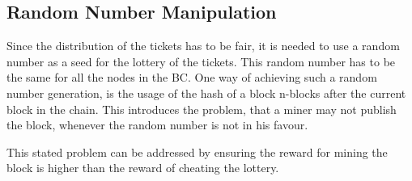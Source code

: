 \subsection{Random Number Manipulation}\label{subsection:random-number-manipulation}
Since the distribution of the tickets has to be fair, it is needed to use a random number as a seed for the lottery of the tickets. This random number has to be the same for all the nodes in the BC. One way of achieving such a random number generation, is the usage of the hash of a block n-blocks after the current block in the chain. This introduces the problem, that a miner may not publish the block, whenever the random number is not in his favour. 

This stated problem can be addressed by ensuring the reward for mining the block is higher than the reward of cheating the lottery. 
